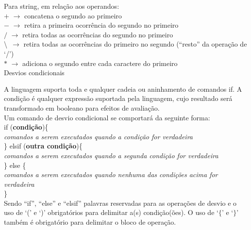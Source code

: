 \documentclass[12pt,a4paper]{article}
\def\emph#1{\textbf{#1}} %
\begin{document}
Para string, em relação aos operandos:\\[0.2cm]
$+$ $\rightarrow$ concatena o segundo ao primeiro\\
$-$ $\rightarrow$ retira a primeira ocorrência do segundo no primeiro\\
$/$ $\rightarrow$ retira todas as ocorrências do segundo no primeiro\\
\textbackslash\ $\rightarrow$ retira todas as ocorrências do primeiro no segundo (``resto'' da operação de `/')\\
$*$ $\rightarrow$ adiciona o segundo entre cada caractere do primeiro\\

\hypertarget{label4}{\Large{Desvios condicionais}}\\[0.3cm]
\normalsize

A linguagem suporta toda e qualquer cadeia ou aninhamento de comandos if. A condição é qualquer expressão suportada pela linguagem, cujo resultado será transformado em booleano para efeitos de avaliação.\\

Um comando de desvio condicional se comportará da seguinte forma: \\

if (\emph{condição})\{ \\

\textit{comandos a serem executados quando a condição for verdadeira} \\

\} elsif (\emph{outra condição})\{\\

\textit{comandos a serem executados quando a segunda condição for verdadeira} \\

\} else \{\\


\textit{comandos a serem executados quando nenhuma das condições acima for verdadeira} \\

\}\\


Sendo ``if'', ``else'' e ``elsif'' palavras reservadas para as operações de desvio e o uso de `(' e `)' obrigatórios para delimitar a(s) condição(ões). O uso de `$\{$' e `$\}$' também é obrigatório para delimitar o bloco de operação.\\
\end{document}
